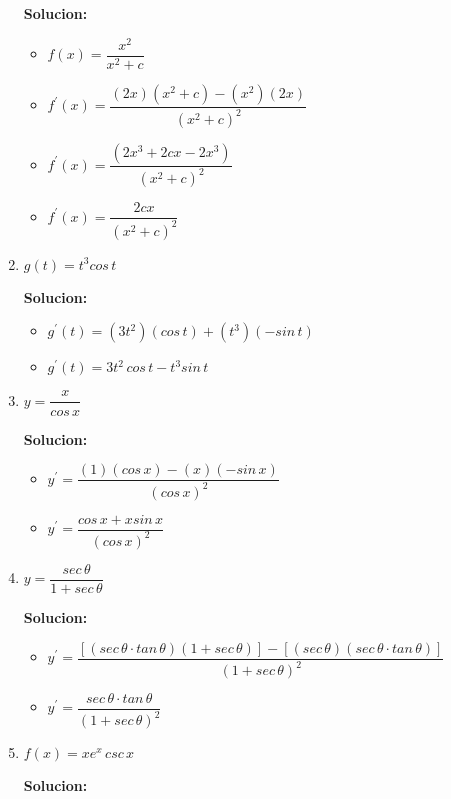 \documentclass{article}
\begin{document}
\begin{enumerate}[start=5, label=\textbf{\arabic*.}]
    \textbf{Solucion: }
    \begin{itemize}
        \item $f(x) = \dfrac{x^2}{x^2+c}$
        \item $f^{\prime}(x) = \dfrac{(2x)(x^2+c) - (x^2)(2x)}{(x^2+c)^2}$
        \item $f^{\prime}(x) = \dfrac{(2x^3+2cx-2x^3)}{(x^2+c)^2}$
        \item $f^{\prime}(x) = \dfrac{2cx}{(x^2+c)^2}$
    \end{itemize}
    \vspace{0.5em}
        
    \item $g(t) = t^3cos\,t$
    
    \textbf{Solucion: }
    \begin{itemize}
        \item $g^{\prime}(t) = (3t^2)(cos\,t) + (t^3)(-sin\,t)$
        \item $g^{\prime}(t) = 3t^2\,cos\,t - t^3sin\,t$
    \end{itemize}
    \vspace{0.5em}
        
    \item $y = \dfrac{x}{cos\,x}$
    
    \textbf{Solucion: }
    \begin{itemize}
        \item $y^{\prime} = \dfrac{(1)(cos\,x) - (x)(-sin\,x)}{(cos\,x)^2}$
        \item $y^{\prime} = \dfrac{cos\,x + xsin\,x}{(cos\,x)^2}$
    \end{itemize}
    \vspace{0.5em}
        
    \item $y = \dfrac{sec\,\theta}{1+sec\,\theta}$
    
    \textbf{Solucion: }
    \begin{itemize}
        \item $y^{\prime} = \dfrac{[(sec\,\theta \cdot tan\,\theta)(1+sec\,\theta)] - [(sec\,\theta)(sec\,\theta \cdot tan\,\theta)]}{(1+sec\,\theta)^2}$
        \item $y^{\prime} = \dfrac{sec\,\theta \cdot tan\,\theta}{(1+sec\,\theta)^2}$
    \end{itemize}
    \vspace{0.5em}
    \item $f(x) = xe^x\,csc\,x$  
    
    \textbf{Solucion: }


\end{enumerate}
\end{document}
